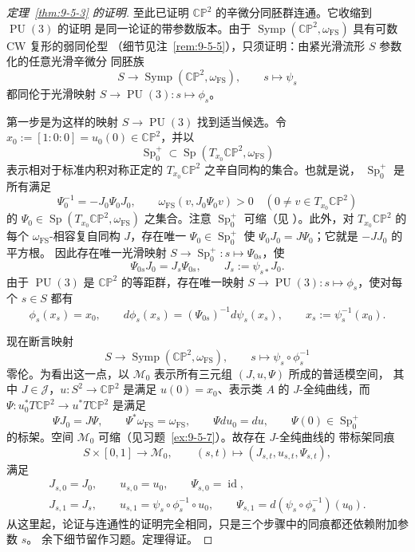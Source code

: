 \begin{proof}[定理~\ref{thm:9-5-3} 的证明]
至此已证明 $\mathbb{CP}^2$ 的辛微分同胚群连通。它收缩到 $\operatorname{PU}(3)$ 的证明
是同一论证的带参数版本。由于
$\operatorname{Symp}(\mathbb{CP}^2,\omega_{\mathrm{FS}})$ 具有可数 CW 复形的弱同伦型
（细节见注~\ref{rem:9-5-5}），只须证明：由紧光滑流形 $S$ 参数化的任意光滑辛微分
同胚族
\[
  S\longrightarrow\operatorname{Symp}(\mathbb{CP}^2,\omega_{\mathrm{FS}}),
  \qquad s\longmapsto\psi_s
\]
都同伦于光滑映射
$S\to\operatorname{PU}(3):s\mapsto\phi_s$。

第一步是为这样的映射 $S\to\operatorname{PU}(3)$ 找到适当候选。令
$x_0:=[1:0:0]=u_0(0)\in\mathbb{CP}^2$，并以
\[
  \operatorname{Sp}_0^+
  \subset\operatorname{Sp}(T_{x_0}\mathbb{CP}^2,\omega_{\mathrm{FS}})
\]
表示相对于标准内积对称正定的 $T_{x_0}\mathbb{CP}^2$ 之辛自同构的集合。也就是说，
$\operatorname{Sp}_0^+$ 是所有满足
\[
  \Psi_0^{-1}=-J_0\Psi_0J_0,
  \qquad \omega_{\mathrm{FS}}(v,J_0\Psi_0v)>0
  \quad(0\ne v\in T_{x_0}\mathbb{CP}^2)
\]
的 $\Psi_0\in\operatorname{Sp}(T_{x_0}\mathbb{CP}^2,\omega_{\mathrm{FS}})$ 之集合。注意
$\operatorname{Sp}_0^+$ 可缩（见 ）。此外，对
$T_{x_0}\mathbb{CP}^2$ 的每个 $\omega_{\mathrm{FS}}$-相容复自同构 $J$，存在唯一
$\Psi_0\in\operatorname{Sp}_0^+$ 使 $\Psi_0J_0=J\Psi_0$；它就是 $-JJ_0$ 的平方根。
因此存在唯一光滑映射
$S\to\operatorname{Sp}_0^+:s\mapsto\Psi_{0s}$，使
\[
  \Psi_{0s}J_0=J_s\Psi_{0s},
  \qquad J_s:=\psi_{s*}J_0.
\]
由于 $\operatorname{PU}(3)$ 是 $\mathbb{CP}^2$ 的等距群，存在唯一映射
$S\to\operatorname{PU}(3):s\mapsto\phi_s$，使对每个 $s\in S$ 都有
\[
  \phi_s(x_s)=x_0,
  \qquad d\phi_s(x_s)=(\Psi_{0s})^{-1}d\psi_s(x_s),
  \qquad x_s:=\psi_s^{-1}(x_0).
\]

现在断言映射
\[
  S\longrightarrow\operatorname{Symp}(\mathbb{CP}^2,\omega_{\mathrm{FS}}),
  \qquad s\longmapsto\psi_s\circ\phi_s^{-1}
\]
零伦。为看出这一点，以 $\mathcal M_0$ 表示所有三元组 $(J,u,\Psi)$ 所成的普适模空间，
其中 $J\in\mathcal J$，$u:S^2\to\mathbb{CP}^2$ 是满足 $u(0)=x_0$、表示类 $A$ 的
$J$-全纯曲线，而
$\Psi:u_0^*T\mathbb{CP}^2\to u^*T\mathbb{CP}^2$ 是满足
\[
  \Psi J_0=J\Psi,
  \qquad \Psi^*\omega_{\mathrm{FS}}=\omega_{\mathrm{FS}},
  \qquad \Psi du_0=du,
  \qquad \Psi(0)\in\operatorname{Sp}_0^+
\]
的标架。空间 $\mathcal M_0$ 可缩（见习题~\ref{ex:9-5-7}）。故存在 $J$-全纯曲线的
带标架同痕
\[
  S\times[0,1]\longrightarrow\mathcal M_0,
  \qquad(s,t)\longmapsto(J_{s,t},u_{s,t},\Psi_{s,t}),
\]
满足
\[
\begin{gathered}
  J_{s,0}=J_0,
  \qquad u_{s,0}=u_0,
  \qquad \Psi_{s,0}=\operatorname{id},\\
  J_{s,1}=J_s,
  \qquad u_{s,1}=\psi_s\circ\phi_s^{-1}\circ u_0,
  \qquad \Psi_{s,1}=d(\psi_s\circ\phi_s^{-1})(u_0).
\end{gathered}
\]
从这里起，论证与连通性的证明完全相同，只是三个步骤中的同痕都还依赖附加参数 $s$。
余下细节留作习题。定理得证。
\end{proof}

